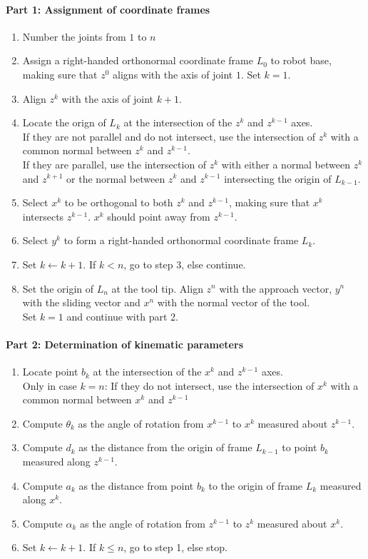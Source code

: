 \documentclass[12pt]{article}
\begin{document}
	\paragraph{Part 1: Assignment of coordinate frames}
	\begin{enumerate}
		\item Number the joints from $1$ to $n$
		\item Assign a right-handed orthonormal coordinate frame $L_0$ to robot base, making sure that $z^0$ aligns with the axis of joint $1$. Set $k = 1$.
		\item Align $z^k$ with the axis of joint $k + 1$.
		\item Locate the orign of $L_k$ at the intersection of the $z^k$ and $z^{k-1}$ axes.\\
		If they are not parallel and do not intersect, use the intersection of $z^k$ with a common normal between $z^k$ and $z^{k-1}$.\\
		If they are parallel, use the intersection of $z^k$ with either a normal between $z^k$ and $z^{k+1}$ or the normal between $z^k$ and $z^{k-1}$ intersecting the origin of $L_{k-1}$.
		\item Select $x^k$ to be orthogonal to both $z^k$ and $z^{k-1}$, making sure that $x^k$ intersects $z^{k-1}$. $x^k$ should point away from $z^{k-1}$.
		\item Select $y^k$ to form a right-handed orthonormal coordinate frame $L_k$.
		\item Set $k \leftarrow k + 1$. If $k < n$, go to step 3, else continue.
		\item Set the origin of $L_n$ at the tool tip. Align $z^n$ with the approach vector, $y^n$ with the sliding vector and $x^n$ with the normal vector of the tool.\\
		Set $k = 1$ and continue with part 2.
	\end{enumerate}
	\paragraph{Part 2: Determination of kinematic parameters}
	\begin{enumerate}
		\item Locate point $b_k$ at the intersection of the $x^k$ and $z^{k-1}$ axes.\\
		Only in case $k = n$: If they do not intersect, use the intersection of $x^k$ with a common normal between $x^k$ and $z^{k-1}$
		\item Compute $\theta_{k}$ as the angle of rotation from $x^{k-1}$ to $x^k$ measured about $z^{k-1}$.
		\item Compute $d_k$ as the distance from the origin of frame $L_{k-1}$ to point $b_k$ measured along $z^{k-1}$.
		\item Compute $a_k$ as the distance from point $b_k$ to the origin of frame $L_k$ measured along $x^k$.
		\item Compute $\alpha_k$ as the angle of rotation from $z^{k-1}$ to $z^k$ measured about $x^k$.
		\item Set $k \leftarrow k + 1$. If $k \leq n$, go to step 1, else stop.
	\end{enumerate}
	
\end{document}
